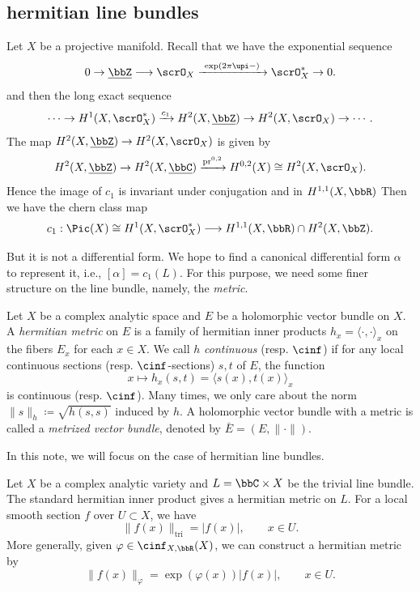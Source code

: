 \subsection[status=draft,tag=0000000,label=\labelNFM{subsec:review-of-metrics}]{hermitian line bundles}

Let $X$ be a projective manifold.
Recall that we have the exponential sequence
\[ 0 \to \underline{\bbZ} \longrightarrow \scrO_X \xrightarrow{\ \exp(2\pi\upi - )\ } \scrO_X^* \to 0. \]
and then the long exact sequence
\[ \cdots \to H^1(X,\scrO_X^*) \xrightarrow{c_1} H^2(X, \underline{\bbZ}) \to H^2(X,\scrO_X) \to \cdots. \]
The map $H^2(X, \underline{\bbZ}) \to H^2(X,\scrO_X)$ is given by
\[ H^2(X,\underline{\bbZ}) \to H^2(X,\underline{\bbC}) \xrightarrow{\operatorname{pr}^{0,2}} H^{0,2}(X) \cong H^2(X,\scrO_X). \]
Hence the image of $c_1$ is invariant under conjugation and in $H^{1,1}(X,\bbR)$
Then we have the chern class map
\[ c_1: \Pic(X) \cong H^1(X,\scrO_X^*) \longrightarrow H^{1,1}(X,\bbR) \cap H^2(X,\bbZ). \]

But it is not a differential form.
We hope to find a canonical differential form $\alpha$ to represent it, i.e., $[\alpha] = c_1(L)$.
For this purpose, we need some finer structure on the line bundle, namely, the \emph{metric}.

\begin{definition}[label=\labelNFM{def:hermitian-line-bundles}, status=draft, tag=0000000]
	Let $X$ be a complex analytic space and $E$ be a holomorphic vector bundle on $X$.
	A \emph{hermitian metric} on $E$ is a family of hermitian inner products \(h_x = \langle \cdot, \cdot \rangle_x\) on the fibers \(E_x\) for each \(x \in X\).
	We call $h$ \emph{continuous} (resp. \emph{$\cinf$}) if for any local continuous sections (resp. $\cinf$-sections) \(s,t\) of \(E\), the function
	\[
		x \mapsto h_x(s,t) = \langle s(x), t(x) \rangle_x
	\]
	is continuous (resp. $\cinf$).
	Many times, we only care about the norm $\|s\|_h \coloneqq \sqrt{h(s,s)}$ induced by $h$.
	A holomorphic vector bundle with a metric is called a \emph{metrized vector bundle}, denoted by $\bar{E} = (E,\|\cdot\|)$.
\end{definition}

In this note, we will focus on the case of hermitian line bundles.

\begin{example}[label=\labelNFM{eg:hermitian-metric-on-trivial-bundle}, status=draft, tag=0000000]
	Let $X$ be a complex analytic variety and $L = \bbC \times X$ be the trivial line bundle.
	The standard hermitian inner product gives a  hermitian metric on $L$.
	For a local smooth section $f$ over $U \subset X$, we have
  \[ \|f(x)\|_{\mathrm{tri}} = |f(x)|, \qquad x \in U. \]
	More generally, given $\varphi \in \cinf_{X,\bbR}(X)$, we can construct a hermitian metric by
  \[ \|f(x)\|_{\varphi} = \exp(\varphi(x))|f(x)|, \qquad x \in U. \]
\end{example}

